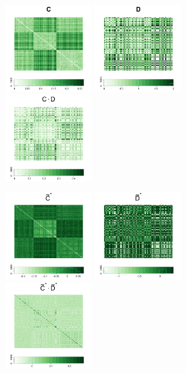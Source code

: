 \documentclass[12pt]{article}
\begin{document}
\begin{figure}[H]
	\centering
	\includegraphics[width=1.5in]{../Figure/C.png}
	\includegraphics[width=1.5in]{../Figure/D.png}
	\includegraphics[width=1.5in]{../Figure/CD.png}
	
	\includegraphics[width=1.5in]{../Figure/tildeCtrunc.png}
	\includegraphics[width=1.5in]{../Figure/tildeDtrunc.png}
	\includegraphics[width=1.5in]{../Figure/tildeCDtrunc.png}
	\label{fig:MGCmatrices}
\end{figure}	
\end{document}
